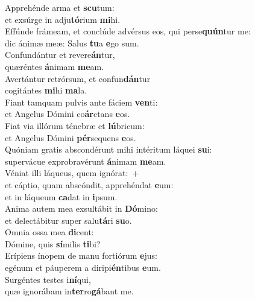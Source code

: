 \evenverse Apprehénde arma et \textbf{scu}tum:~\*\\
\evenverse et exsúrge in adju\textbf{tó}rium \textbf{mi}hi.\\
\oddverse Effúnde frámeam, et conclúde advérsus eos, qui perse\textbf{quún}tur me:~\*\\
\oddverse dic ánimæ meæ: Salus \textbf{tu}a \textbf{e}go sum.\\
\evenverse Confundántur et revere\textbf{án}tur,~\*\\
\evenverse quæréntes \textbf{á}nimam \textbf{me}am.\\
\oddverse Avertántur retrórsum, et confun\textbf{dán}tur~\*\\
\oddverse cogitántes \textbf{mi}hi \textbf{ma}la.\\
\evenverse Fiant tamquam pulvis ante fáciem \textbf{ven}ti:~\*\\
\evenverse et Angelus Dómini co\textbf{ár}ctans \textbf{e}os.\\
\oddverse Fiat via illórum ténebræ et \textbf{lú}bricum:~\*\\
\oddverse et Angelus Dómini \textbf{pér}sequens \textbf{e}os.\\
\evenverse Quóniam gratis abscondérunt mihi intéritum láquei \textbf{su}i:~\*\\
\evenverse supervácue exprobravérunt \textbf{á}nimam \textbf{me}am.\\
\oddverse Véniat illi láqueus, quem ignórat:~+\\
\oddverse  et cáptio, quam abscóndit, apprehéndat \textbf{e}um:~\*\\
\oddverse et in láqueum \textbf{ca}dat in \textbf{i}psum.\\
\evenverse Anima autem mea exsultábit in \textbf{Dó}mino:~\*\\
\evenverse et delectábitur super salu\textbf{tá}ri \textbf{su}o.\\
\oddverse Omnia ossa mea \textbf{di}cent:~\*\\
\oddverse Dómine, quis \textbf{sí}milis \textbf{ti}bi?\\
\evenverse Erípiens ínopem de manu fortiórum \textbf{e}jus:~\*\\
\evenverse egénum et páuperem a diripi\textbf{én}tibus \textbf{e}um.\\
\oddverse Surgéntes testes i\textbf{ní}qui,~\*\\
\oddverse quæ ignorábam in\textbf{ter}ro\textbf{gá}bant me.\\
